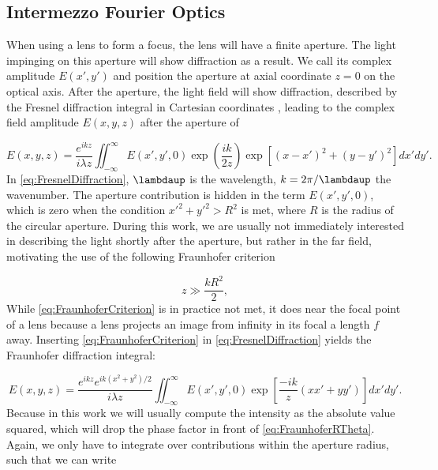\begin{mdframed}
    \subsection*{Intermezzo Fourier Optics}
    
    When using a lens to form a focus, the lens will have a finite aperture.
    The light impinging on this aperture will show diffraction as a result.
    We call its complex amplitude $E(x',y')$ and position the aperture at axial coordinate $z = 0$ on the optical axis.
    After the aperture, the light field will show diffraction, described by the Fresnel diffraction integral in Cartesian coordinates \cite{Goodman2005}, leading to the complex field amplitude $E(x,y,z)$ after the aperture of 

    \begin{equation}\label{eq:FresnelDiffraction}
        E(x,y,z) = 
        \frac{e^{ikz}}{i \lambda z} \iint_{-\infty}^{\infty} E(x',y',0) \exp{\left(\frac{ik}{2z}\right)} \exp{\left[(x-x')^2+(y-y')^2\right]} dx'dy'.
    \end{equation}
    In \cref{eq:FresnelDiffraction}, $\lambdaup$ is the wavelength, $k=2\pi/\lambdaup$ the wavenumber. The aperture contribution is hidden in the term $E(x',y',0)$, which is zero when the condition $x'^2+y'^2>R^2$ is met, where $R$ is the radius of the circular aperture.
    During this work, we are usually not immediately interested in describing the light shortly after the aperture, but rather in the far field, motivating the use of the following Fraunhofer criterion
    
    \begin{equation}\label{eq:FraunhoferCriterion}
        z \gg \frac{k R^2}{2},
    \end{equation}
    While \cref{eq:FraunhoferCriterion} is in practice not met, it does near the focal point of a lens because a lens projects an image from infinity in its focal a length $f$ away. 
    Inserting \cref{eq:FraunhoferCriterion} in \cref{eq:FresnelDiffraction} yields the Fraunhofer diffraction integral:
    
    \begin{equation}\label{eq:FraunhoferDiffraction}
        E(x, y, z)=\frac{e^{i k z} e^{i k\left(x^{2}+y^{2}\right)/2}}{i \lambda z} \iint_{-\infty}^{\infty} E(x', y',0) \exp \left[\frac{-ik}{z}(x x'+y y')\right] dx' dy'.
    \end{equation}
    Because in this work we will usually compute the intensity as the absolute value squared, which will drop the phase factor in front of \cref{eq:FraunhoferRTheta}. Again, we only have to integrate over contributions within the aperture radius, such that we can write 
    

\end{mdframed}
